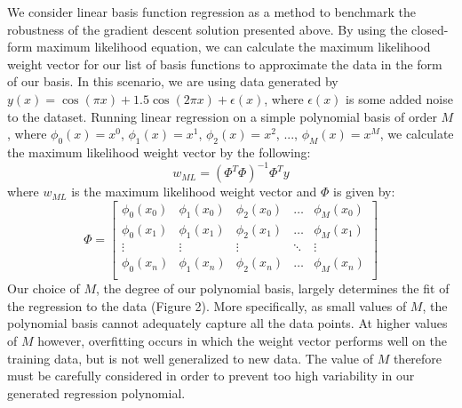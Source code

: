 \documentclass{article}
\begin{document}
We consider linear basis function regression as a method to benchmark the robustness of the gradient descent solution presented above. By using the closed-form maximum likelihood equation, we can calculate the maximum likelihood weight vector for our list of basis functions to approximate the data in the form of our basis. In this scenario, we are using data generated by $y(x) = \cos(\pi x) + 1.5 \cos(2 \pi x) + \epsilon(x)$, where $\epsilon(x)$ is some added noise to the dataset. Running linear regression on a simple polynomial basis of order $M$, where $\phi_0(x) = x^0$, $\phi_1(x) = x^1$, $\phi_2(x) = x^2$, ..., $\phi_M(x) = x^M$, we calculate the maximum likelihood weight vector by the following:
$$w_{ML} = (\Phi^T \Phi)^{-1} \Phi^T y$$
where $w_{ML}$ is the maximum likelihood weight vector and $\Phi$ is given by:
$$\Phi =
\begin{bmatrix}
  \phi_0(x_0)   & \phi_1(x_0)   & \phi_2(x_0)   & \dots   & \phi_M(x_0) \\
  \phi_0(x_1)   & \phi_1(x_1)   & \phi_2(x_1)   & \dots   & \phi_M(x_1) \\
  \vdots        & \vdots        & \vdots        & \ddots  & \vdots \\
  \phi_0(x_n)   & \phi_1(x_n)   & \phi_2(x_n)   & \dots   & \phi_M(x_n) \\
\end{bmatrix}
$$
Our choice of $M$, the degree of our polynomial basis, largely determines the fit of the regression to the data (Figure 2). More specifically, as small values of $M$, the polynomial basis cannot adequately capture all the data points. At higher values of $M$ however, overfitting occurs in which the weight vector performs well on the training data, but is not well generalized to new data. The value of $M$ therefore must be carefully considered in order to prevent too high variability in our generated regression polynomial. \\
\end{document}
